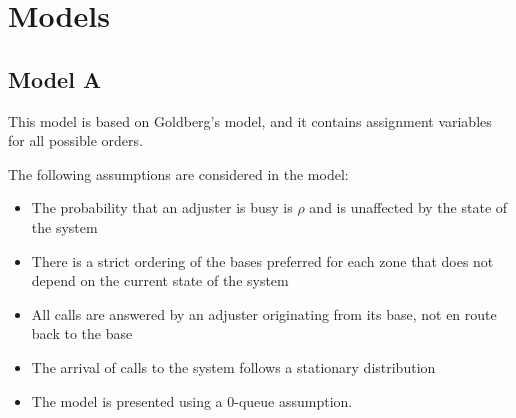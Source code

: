 
\section{Models}
\subsection{Model A}

\begin{frame}
  This model is based on Goldberg's model, and it contains assignment
  variables for all possible orders.

  The following assumptions are considered in the model:
  \begin{itemize}
  \item The probability that an adjuster is busy is $\rho$
    and is unaffected by the state of the system
  \item There is a strict ordering of the bases preferred for each zone
    that does not depend on the current state of the system
  \item All calls are answered by an adjuster originating from its base,
    not en route back to the base
  \item The arrival of calls to the system follows a stationary distribution
  \item The model is presented using a 0-queue assumption.
  \end{itemize}
  
\end{frame}


